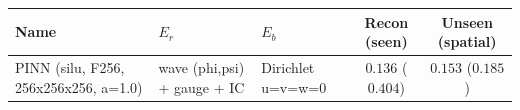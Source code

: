 \begin{center}
\begin{tabular}{lll cc}
\toprule
Name & $E_r$ & $E_b$ & Recon (seen) & Unseen (spatial) \\
\midrule
PINN (silu, F256, 256x256x256, a=1.0) & wave (phi,psi) + gauge + IC & Dirichlet u=v=w=0 & $0.136$ ($0.404$) & $0.153$ ($0.185$) \\
\bottomrule
\end{tabular}
\end{center}
